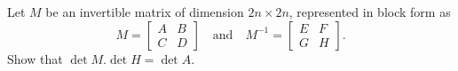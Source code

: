 \documentclass{article}
\begin{document}
\setlength{\parindent}{0pt}
Let $M$ be an invertible matrix of dimension $2n\times 2n$, represented in block form as 
\[
M=\left[ \begin{matrix} A & B\\ C& D\end{matrix}\right] \quad \text{and} \quad M^{-1}=\left[ \begin{matrix} E & F\\ G& H\end{matrix}\right]. 
\]
Show that $\det M. \det H=\det A$.
\end{document}
